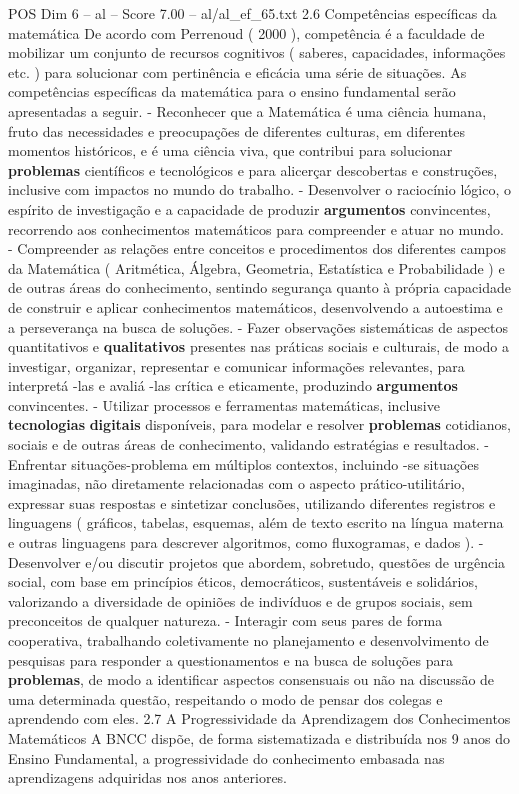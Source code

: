 \begin{textsample}{POS Dim 6 – al – Score 7.00 – al/al\_ef\_65.txt}  \label{ex:f6_pos_225}
2.6 Competências específicas da matemática De acordo com Perrenoud ( 2000 ), competência é a faculdade de mobilizar um conjunto de recursos cognitivos ( saberes, capacidades, informações etc. ) para solucionar com pertinência e eficácia uma série de situações.
As competências específicas da matemática para o ensino fundamental serão apresentadas a seguir. - Reconhecer que a Matemática é uma ciência humana, fruto das necessidades e preocupações de diferentes culturas, em diferentes momentos históricos, e é uma ciência viva, que contribui para solucionar \textbf{problemas} científicos e tecnológicos e para alicerçar descobertas e construções, inclusive com impactos no mundo do trabalho. - Desenvolver o raciocínio lógico, o espírito de investigação e a capacidade de produzir \textbf{argumentos} convincentes, recorrendo aos conhecimentos matemáticos para compreender e atuar no mundo. - Compreender as relações entre conceitos e procedimentos dos diferentes campos da Matemática ( Aritmética, Álgebra, Geometria, Estatística e Probabilidade ) e de outras áreas do conhecimento, sentindo segurança quanto à própria capacidade de construir e aplicar conhecimentos matemáticos, desenvolvendo a autoestima e a perseverança na busca de soluções. - Fazer observações sistemáticas de aspectos quantitativos e \textbf{qualitativos} presentes nas práticas sociais e culturais, de modo a investigar, organizar, representar e comunicar informações relevantes, para interpretá -las e avaliá -las crítica e eticamente, produzindo \textbf{argumentos} convincentes. - Utilizar processos e ferramentas matemáticas, inclusive \textbf{tecnologias} \textbf{digitais} disponíveis, para modelar e resolver \textbf{problemas} cotidianos, sociais e de outras áreas de conhecimento, validando estratégias e resultados. - Enfrentar situações-problema em múltiplos contextos, incluindo -se situações imaginadas, não diretamente relacionadas com o aspecto prático-utilitário, expressar suas respostas e sintetizar conclusões, utilizando diferentes registros e linguagens ( gráficos, tabelas, esquemas, além de texto escrito na língua materna e outras linguagens para descrever algoritmos, como fluxogramas, e dados ). - Desenvolver e/ou discutir projetos que abordem, sobretudo, questões de urgência social, com base em princípios éticos, democráticos, sustentáveis e solidários, valorizando a diversidade de opiniões de indivíduos e de grupos sociais, sem preconceitos de qualquer natureza. - Interagir com seus pares de forma cooperativa, trabalhando coletivamente no planejamento e desenvolvimento de pesquisas para responder a questionamentos e na busca de soluções para \textbf{problemas}, de modo a identificar aspectos consensuais ou não na discussão de uma determinada questão, respeitando o modo de pensar dos colegas e aprendendo com eles. 2.7 A Progressividade da Aprendizagem dos Conhecimentos Matemáticos A BNCC dispõe, de forma sistematizada e distribuída nos 9 anos do Ensino Fundamental, a progressividade do conhecimento embasada nas aprendizagens adquiridas nos anos anteriores.

\end{textsample}

